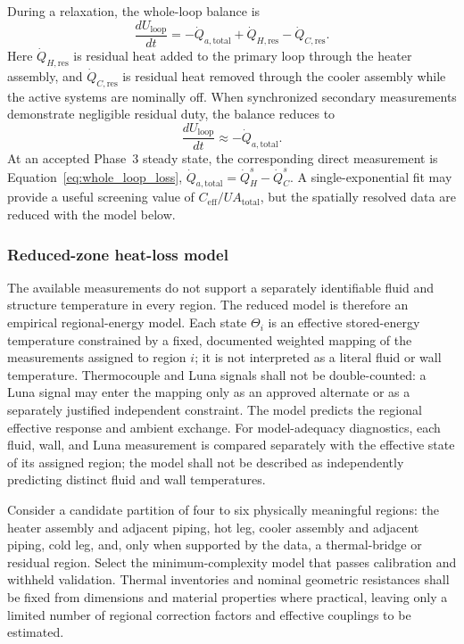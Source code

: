 \documentclass[11pt]{article}
\newcommand{\QHs}{\dot Q_{H}^{s}}
\newcommand{\QCs}{\dot Q_{C}^{s}}
\begin{document}
During a relaxation, the whole-loop balance is
\begin{equation}
    \frac{dU_{\mathrm{loop}}}{dt}
    =
    -\dot Q_{a,\mathrm{total}}
    +\dot Q_{H,\mathrm{res}}
    -\dot Q_{C,\mathrm{res}}.
\end{equation}
Here $\dot Q_{H,\mathrm{res}}$ is residual heat added to the primary loop through the heater assembly, and $\dot Q_{C,\mathrm{res}}$ is residual heat removed through the cooler assembly while the active systems are nominally off. When synchronized secondary measurements demonstrate negligible residual duty, the balance reduces to
\begin{equation}
    \frac{dU_{\mathrm{loop}}}{dt}
    \approx
    -\dot Q_{a,\mathrm{total}}.
    \label{eq:relax_balance}
\end{equation}
At an accepted Phase~3 steady state, the corresponding direct measurement is Equation~\eqref{eq:whole_loop_loss}, $\dot Q_{a,\mathrm{total}}=\QHs-\QCs$. A single-exponential fit may provide a useful screening value of $C_{\mathrm{eff}}/UA_{\mathrm{total}}$, but the spatially resolved data are reduced with the model below.

\subsubsection{Reduced-zone heat-loss model}
\label{sec:heat_loss}

The available measurements do not support a separately identifiable fluid and structure temperature in every region. The reduced model is therefore an empirical regional-energy model. Each state $\Theta_i$ is an effective stored-energy temperature constrained by a fixed, documented weighted mapping of the measurements assigned to region $i$; it is not interpreted as a literal fluid or wall temperature. Thermocouple and Luna signals shall not be double-counted: a Luna signal may enter the mapping only as an approved alternate or as a separately justified independent constraint. The model predicts the regional effective response and ambient exchange. For model-adequacy diagnostics, each fluid, wall, and Luna measurement is compared separately with the effective state of its assigned region; the model shall not be described as independently predicting distinct fluid and wall temperatures.

Consider a candidate partition of four to six physically meaningful regions: the heater assembly and adjacent piping, hot leg, cooler assembly and adjacent piping, cold leg, and, only when supported by the data, a thermal-bridge or residual region. Select the minimum-complexity model that passes calibration and withheld validation. Thermal inventories and nominal geometric resistances shall be fixed from dimensions and material properties where practical, leaving only a limited number of regional correction factors and effective couplings to be estimated.
\end{document}
